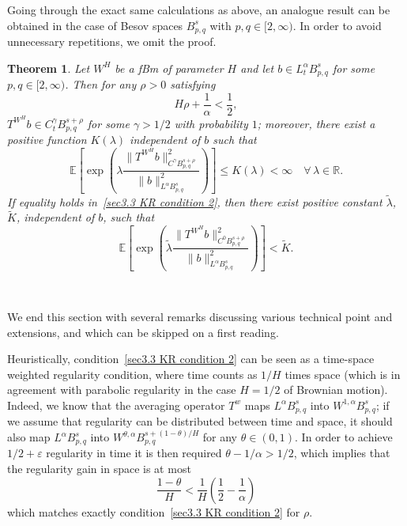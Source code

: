 \documentclass[10pt]{article}
\newtheorem{theorem}{Theorem}
\begin{document}
Going through the exact same calculations as above, an analogue result can be
obtained in the case of Besov spaces $B^s_{p, q}$ with $p, q \in [2, \infty)$.
In order to avoid unnecessary repetitions, we omit the proof.

\begin{theorem}
  \label{sec3.3 thm averaging besov}Let $W^H$ be a fBm of parameter $H$ and
  let $b \in L^{\alpha}_t B^s_{p, q}$ for some $p, q \in [2, \infty)$. Then
  for any $\rho > 0$ satisfying
  \begin{equation}
    H \rho + \frac{1}{\alpha} < \frac{1}{2}, \label{sec3.3 KR condition 2}
  \end{equation}
  $T^{W^H} b \in C^{\gamma}_t B^{s + \rho}_{p, q}$ for some $\gamma > 1 / 2$
  with probability $1$; moreover, there exist a positive function $K
  (\lambda)$ independent of $b$ such that
  \begin{equation}
    \mathbb{E} \left[ \exp \left( \lambda \frac{\| T^{W^H} b \|^2_{C^{\gamma}
    B_{p, q}^{s + \rho}}}{\| b \|_{L^{\alpha} B_{p, q}^s}^2} \right) \right]
    \leqslant K (\lambda) < \infty \quad \forall \, \lambda \in \mathbb{R}.
    \label{sec3.3 thm exp integrability besov}
  \end{equation}
  If equality holds in~{\eqref{sec3.3 KR condition 2}}, then there exist
  positive constant $\tilde{\lambda}$, $\tilde{K}$, independent of $b$, such
  that
  \begin{equation}
    \mathbb{E} \left[ \exp \left( \widetilde{\lambda} \frac{\| T^{W^H} b
    \|^2_{C^0 B_{p, q}^{s + \rho}}}{\| b \|^2_{L^{\alpha} B_{p, q}^s}} \right)
    \right] < \tilde{K} .
  \end{equation}
\end{theorem}

\

We end this section with several remarks discussing various technical point
and extensions, and which can be skipped on a first reading.

\begin{remark}
  Heuristically, condition~{\eqref{sec3.3 KR condition 2}} can be seen as a
  time-space weighted regularity condition, where time counts as $1 / H$ times
  space (which is in agreement with parabolic regularity in the case $H = 1 /
  2$ of Brownian motion). Indeed, we know that the averaging operator $T^w$
  maps $L^{\alpha} B^s_{p, q}$ into $W^{1, \alpha} B^s_{p, q}$; if we assume
  that regularity can be distributed between time and space, it should also
  map $L^{\alpha} B^s_{p, q}$ into $W^{\theta, \alpha} B^{s + (1 - \theta) /
  H}_{p, q}$ for any $\theta \in (0, 1)$. In order to achieve $1 / 2 +
  \varepsilon$ regularity in time it is then required $\theta - 1 / \alpha > 1
  / 2$, which implies that the regularity gain in space is at most
  \[ \frac{1 - \theta}{H} < \frac{1}{H} \left( \frac{1}{2} - \frac{1}{\alpha}
     \right) \]
  which matches exactly condition~{\eqref{sec3.3 KR condition 2}} for $\rho$.
\end{remark}
\end{document}
